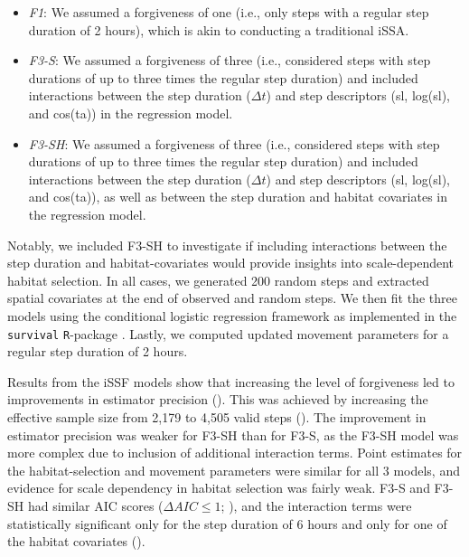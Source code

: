 \documentclass[../FinalThesis.tex]{subfiles}
\begin{document}
\begin{itemize}
  \item \textit{F1}: We assumed a forgiveness of one (i.e., only steps with a
  regular step duration of 2 hours), which is akin to conducting a traditional
  iSSA.

  \item \textit{F3-S}: We assumed a forgiveness of three (i.e., considered steps
  with step durations of up to three times the regular step duration) and
  included interactions between the step duration ($\Delta t$) and step
  descriptors (sl, log(sl), and cos(ta)) in the regression model.

  \item \textit{F3-SH}: We assumed a forgiveness of three (i.e., considered
  steps with step durations of up to three times the regular step duration) and
  included interactions between the step duration ($\Delta t$) and step
  descriptors (sl, log(sl), and cos(ta)), as well as between the step duration
  and habitat covariates in the regression model.

\end{itemize}

\noindent Notably, we included F3-SH to investigate if including interactions
between the step duration and habitat-covariates would provide insights into
scale-dependent habitat selection. In all cases, we generated 200 random steps
and extracted spatial covariates at the end of observed and random steps. We
then fit the three models using the conditional logistic regression framework as
implemented in the \texttt{survival} \texttt{R}-package \citep{Therneau.2024}.
Lastly, we computed updated movement parameters for a regular step duration of 2
hours.

Results from the iSSF models show that increasing the level of forgiveness led
to improvements in estimator precision (). This was achieved by
increasing the effective sample size from 2,179 to 4,505 valid steps
(). The improvement in estimator precision was weaker for
F3-SH than for F3-S, as the F3-SH model was more complex due to inclusion of
additional interaction terms. Point estimates for the habitat-selection and
movement parameters were similar for all 3 models, and evidence for scale
dependency in habitat selection was fairly weak. F3-S and F3-SH had similar AIC
scores ($\Delta AIC \leq 1$; ), and the interaction terms
were statistically significant only for the step duration of 6 hours and only
for one of the habitat covariates ().
\end{document}
